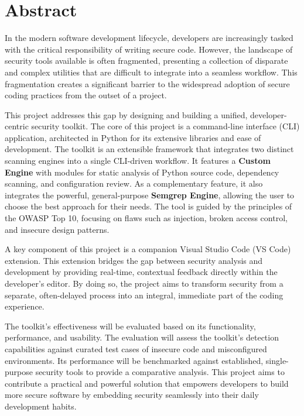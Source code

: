 %
%
\chapter{Abstract}
\begin{SingleSpace}
In the modern software development lifecycle, developers are increasingly tasked with the critical responsibility of writing secure code. However, the landscape of security tools available is often fragmented, presenting a collection of disparate and complex utilities that are difficult to integrate into a seamless workflow. This fragmentation creates a significant barrier to the widespread adoption of secure coding practices from the outset of a project.

This project addresses this gap by designing and building a unified, developer-centric security toolkit. The core of this project is a command-line interface (CLI) application, architected in Python for its extensive libraries and ease of development. The toolkit is an extensible framework that integrates two distinct scanning engines into a single CLI-driven workflow. It features a \textbf{Custom Engine} with modules for static analysis of Python source code, dependency scanning, and configuration review. As a complementary feature, it also integrates the powerful, general-purpose \textbf{Semgrep Engine}, allowing the user to choose the best approach for their needs. The tool is guided by the principles of the OWASP Top 10, focusing on flaws such as injection, broken access control, and insecure design patterns.

A key component of this project is a companion Visual Studio Code (VS Code) extension. This extension bridges the gap between security analysis and development by providing real-time, contextual feedback directly within the developer's editor. By doing so, the project aims to transform security from a separate, often-delayed process into an integral, immediate part of the coding experience.

The toolkit's effectiveness will be evaluated based on its functionality, performance, and usability. The evaluation will assess the toolkit's detection capabilities against curated test cases of insecure code and misconfigured environments. Its performance will be benchmarked against established, single-purpose security tools to provide a comparative analysis. This project aims to contribute a practical and powerful solution that empowers developers to build more secure software by embedding security seamlessly into their daily development habits.
\end{SingleSpace}
